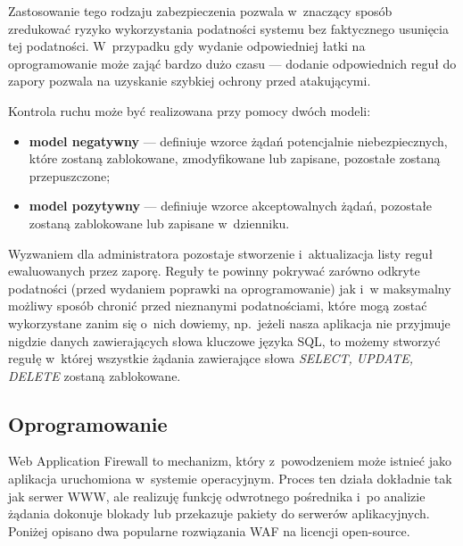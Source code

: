 \documentclass[12pt,a4paper,polish,thesis]{dcsbook}
\begin{document}
Zastosowanie tego rodzaju zabezpieczenia pozwala w~znaczący sposób zredukować ryzyko wykorzystania podatności systemu bez faktycznego usunięcia tej podatności. W~przypadku gdy wydanie odpowiedniej łatki na oprogramowanie może zająć bardzo dużo czasu --- dodanie odpowiednich reguł do zapory pozwala na uzyskanie szybkiej ochrony przed atakującymi.

Kontrola ruchu może być realizowana przy pomocy dwóch modeli:
\begin{itemize}
\item \textbf{model negatywny} --- definiuje wzorce żądań potencjalnie niebezpiecznych, które zostaną zablokowane, zmodyfikowane lub zapisane, pozostałe zostaną przepuszczone;
\item \textbf{model pozytywny} --- definiuje wzorce akceptowalnych żądań, pozostałe zostaną zablokowane lub zapisane w~dzienniku.
\end{itemize}

Wyzwaniem dla administratora pozostaje stworzenie i~aktualizacja listy reguł ewaluowanych przez zaporę. Reguły te powinny pokrywać zarówno odkryte podatności (przed wydaniem poprawki na oprogramowanie) jak i~w maksymalny możliwy sposób chronić przed nieznanymi podatnościami, które mogą zostać wykorzystane zanim się o~nich dowiemy, np.~jeżeli nasza aplikacja nie przyjmuje nigdzie danych zawierających słowa kluczowe języka SQL, to możemy stworzyć regułę w~której wszystkie żądania zawierające słowa \textit{SELECT, UPDATE, DELETE} zostaną zablokowane.

\subsection{Oprogramowanie}
Web Application Firewall to mechanizm, który z~powodzeniem może istnieć jako aplikacja uruchomiona w~systemie operacyjnym. Proces ten działa dokładnie tak jak serwer WWW, ale realizuję funkcję odwrotnego pośrednika i~po analizie żądania dokonuje blokady lub przekazuje pakiety do serwerów aplikacyjnych. Poniżej opisano dwa popularne rozwiązania WAF na licencji open-source.
\end{document}
